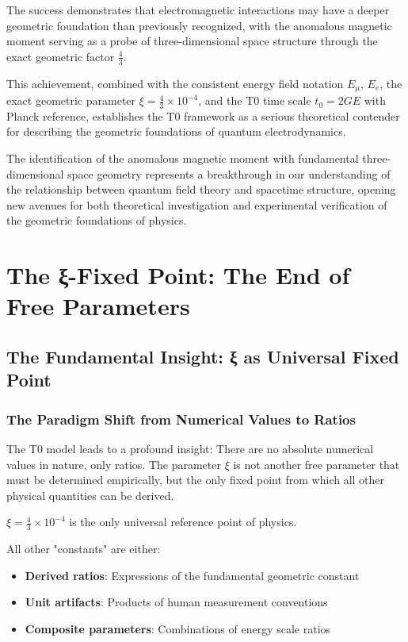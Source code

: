 \documentclass[12pt,a4paper]{report}
\newcommand{\tzero}{t_0}                  %
\begin{document}
The success demonstrates that electromagnetic interactions may have a deeper geometric foundation than previously recognized, with the anomalous magnetic moment serving as a probe of three-dimensional space structure through the exact geometric factor $\frac{4}{3}$.

This achievement, combined with the consistent energy field notation $E_\mu$, $E_e$, the exact geometric parameter $\xi = \frac{4}{3} \times 10^{-4}$, and the T0 time scale $\tzero = 2GE$ with Planck reference, establishes the T0 framework as a serious theoretical contender for describing the geometric foundations of quantum electrodynamics.

The identification of the anomalous magnetic moment with fundamental three-dimensional space geometry represents a breakthrough in our understanding of the relationship between quantum field theory and spacetime structure, opening new avenues for both theoretical investigation and experimental verification of the geometric foundations of physics.
\chapter{The ξ-Fixed Point: The End of Free Parameters}
\label{chap:xi_fixed_point}

\section{The Fundamental Insight: ξ as Universal Fixed Point}
\label{sec:xi_universal_fixed_point}

\subsection{The Paradigm Shift from Numerical Values to Ratios}
\label{subsec:paradigm_shift_ratios}

The T0 model leads to a profound insight: There are no absolute numerical values in nature, only ratios. The parameter $\xi$ is not another free parameter that must be determined empirically, but the only fixed point from which all other physical quantities can be derived.

\begin{tcolorbox}[colback=red!5!white,colframe=red!75!black,title=Fundamental Insight]
	$\xi = \frac{4}{3} \times 10^{-4}$ is the only universal reference point of physics.
	
	All other "constants" are either:
	\begin{itemize}
		\item \textbf{Derived ratios}: Expressions of the fundamental geometric constant
		\item \textbf{Unit artifacts}: Products of human measurement conventions
		\item \textbf{Composite parameters}: Combinations of energy scale ratios
	\end{itemize}
\end{tcolorbox}
\end{document}
